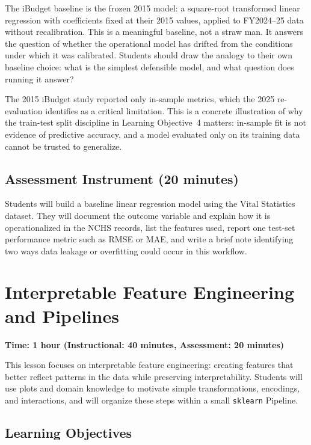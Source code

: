 The iBudget baseline is the frozen 2015 model: a square-root
transformed linear regression with coefficients fixed at their 2015
values, applied to FY2024--25 data without recalibration. This is
a meaningful baseline, not a straw man. It answers the question of
whether the operational model has drifted from the conditions under
which it was calibrated. Students should draw the analogy to their
own baseline choice: what is the simplest defensible model, and
what question does running it answer?

The 2015 iBudget study reported only in-sample metrics, which the
2025 re-evaluation identifies as a critical limitation. This is a
concrete illustration of why the train-test split discipline in
Learning Objective~4 matters: in-sample fit is not evidence of
predictive accuracy, and a model evaluated only on its training data
cannot be trusted to generalize.

\subsection{Assessment Instrument (20 minutes)}

Students will build a baseline linear regression model using the
Vital Statistics dataset. They will document the outcome variable
and explain how it is operationalized in the NCHS records, list the
features used, report one test-set performance metric such as RMSE
or MAE, and write a brief note identifying two ways data leakage or
overfitting could occur in this workflow.

\section{Interpretable Feature Engineering and Pipelines}
\label{sec:4.2}

\textbf{Time: 1 hour (Instructional: 40 minutes, Assessment:
20 minutes)}

\noindent This lesson focuses on interpretable feature engineering:
creating features that better reflect patterns in the data while
preserving interpretability. Students will use plots and domain
knowledge to motivate simple transformations, encodings, and
interactions, and will organize these steps within a small
\verb|sklearn| Pipeline.

\subsection{Learning Objectives}


